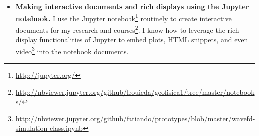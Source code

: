 \documentclass[12pt]{article}
\begin{document}
\begin{itemize}
    \item \textbf{Making interactive documents and rich displays using the
        Jupyter notebook.}
        I use the Jupyter notebook\footnote{\url{http://jupyter.org/}}
        routinely to create interactive documents for my research
        and
        courses\footnote{\url{http://nbviewer.jupyter.org/github/leouieda/geofisica1/tree/master/notebooks/}}.
        I know how to leverage the rich display functionalities of
        Jupyter to embed plots, HTML snippets, and even
        video\footnote{\url{http://nbviewer.jupyter.org/github/fatiando/prototypes/blob/master/wavefd-simulation-class.ipynb}}
        into the notebook documents.
\end{itemize}
\end{document}
